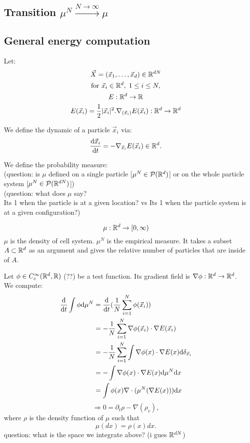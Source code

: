 \subsection{Transition $\mu^N \xrightarrow{N \to \infty} \mu$ }


\subsection{General energy computation}

Let:
\begin{gather*}
    \vec{X} = (\vec{x}_1, \ldots, \vec{x}_d) \in \mathbb{R}^{dN} \\
    \text{for } \vec{x}_i \in \mathbb{R}^d, \; 1 \leq i \leq N, \\
    E: \mathbb{R}^d \rightarrow \mathbb{R} \\ 
    E(\vec{x}_i) = \frac{1}{2} |\vec{x}_i|^2.
    \nabla_{(\vec{x}_i)} E(\vec{x}_i): \mathbb{R}^d \rightarrow \mathbb{R}^d
\end{gather*}

We define the dynamic of a particle $\vec{x}_i$ via: \\
\[ \dfrac{\mathrm{d} \vec{x}_i}{\mathrm{d} t} = - \nabla_{\vec{x}_i} E(\vec{x}_i) \in \mathbb{R}^{d}. \]

We define the probability measure:\\
(question: is $\mu$ defined on a single particle [$\mu^{N} \in \mathcal{P}(\mathbb{R}^d)$] or on the whole particle system [$\mu^{N} \in \mathcal{P}(\mathbb{R}^{dN})$]) \\
(question: what does $\mu$ say? \\
Its 1 when the particle is at a given location? vs Its 1 when the particle system is at a given configuration?)

\[ \mu: \mathbb{R}^d \rightarrow [0,\infty)  \]
$\mu$ is the density of cell system.
$\mu^N$ is the empirical measure. 
It takes a subset $A \subset \mathbb{R}^d$ as an argument and gives the relative number of particles that are inside of $A$. 

Let $\phi \in C_c^{\infty}(\mathbb{R}^{d}, \mathbb{R})$ (??) be a test function. 
Its gradient field is $ \nabla \phi : \mathbb{R}^d \rightarrow \mathbb{R}^d$. 
We compute: 
\begin{align*}
    \frac{\mathrm{d}}{\mathrm{d} t} \int \phi \mathrm{d} \mu^N 
    &= \frac{\mathrm{d}}{\mathrm{d} t} (\frac{1}{N} \sum\limits_{i=1}^{N} \phi(\vec{x}_i)) \\
    &= - \frac{1}{N} \sum\limits_{i=1}^{N} \nabla \phi(\vec{x}_i) \cdot \nabla E(\vec{x}_i) \\
    &= - \frac{1}{N} \sum\limits_{i=1}^{N} \int \nabla \phi(x) \cdot \nabla E(x) \mathrm{d} \delta_{\vec{x}_i} \\
    &= - \int \nabla \phi(x) \cdot \nabla E(x) \mathrm{d} \mu^N \mathrm{d} x \\
    &= \int \phi(x)  \nabla \cdot ( \mu^N(\nabla E(x))) \mathrm{d} x \\
\end{align*}
\[ \Rightarrow  0 = \partial_t \rho - \nabla(\rho_v),\]
where $\rho$ is the density function of $\mu$ such that \[ \mu(dx) = \rho(x) dx. \]
question: what is the space we integrate above? (i gues $\mathbb{R}^{dN}$)